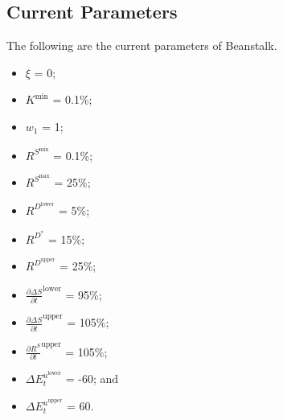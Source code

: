 \documentclass[class=article, crop=false]{standalone}
\begin{document}
\subsection{Current Parameters}
The following are the current parameters of Beanstalk.
\begin{itemize}[itemsep=3pt,leftmargin=16pt]
    \item $\xi$ = 0;
    \item $K^{\text{min}}$ = 0.1\%;
    \item $w_1$ = 1;
    \item $R^{S^{\text{min}}}$ = 0.1\%;
    \item $R^{S^{\text{max}}}$ = 25\%;
    \item $R^{D^{\text{lower}}}$ = 5\%;
    \item $R^{D^*}$ = 15\%;
    \item $R^{D^{\text{upper}}}$ = 25\%;
    \item $\frac{\partial \Delta S}{\partial t}^{\text{lower}}$ = 95\%;
    \item $\frac{\partial \Delta S}{\partial t}^{\text{upper}}$ = 105\%;
    \item $\frac{\partial R^S}{\partial t}^{\text{upper}}$ = 105\%;
    \item $\Delta E_{t}^{u^{\text{lower}}}$ = -60; and
    \item $\Delta E_{t}^{u^{\text{upper}}}$ = 60.
\end{itemize}
\end{document}
